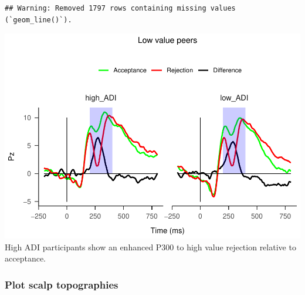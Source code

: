 \documentclass[
]{article}
\begin{document}
\begin{verbatim}
## Warning: Removed 1797 rows containing missing values (`geom_line()`).
\end{verbatim}

\includegraphics{do01_BUDS_files/figure-latex/unnamed-chunk-11-2.pdf}
High ADI participants show an enhanced P300 to high value rejection
relative to acceptance.

\hypertarget{plot-scalp-topographies}{%
\subsubsection{Plot scalp topographies}\label{plot-scalp-topographies}}
\end{document}
